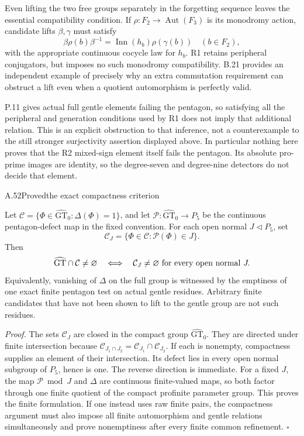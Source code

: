 Even lifting the two free groups separately in the forgetting
sequence leaves the essential compatibility condition. If
$\rho:F_2\to\operatorname{Aut}(F_3)$ is its monodromy action,
candidate lifts $\beta,\gamma$ must satisfy
\[
 \beta\rho(b)\beta^{-1}
   =\operatorname{Inn}(h_b)\rho(\gamma(b))
       \quad(b\in F_2),
\]
with the appropriate continuous cocycle law for $h_b$.
R1 retains peripheral conjugators, but imposes no such
monodromy compatibility. B.21 provides an independent example
of precisely why an extra commutation requirement can obstruct
a lift even when a quotient automorphism is perfectly valid.

P.11 gives actual full gentle elements failing the pentagon,
so satisfying all the peripheral and generation conditions
used by R1 does not imply that additional relation. This is
an explicit obstruction to that inference, not a counterexample
to the still stronger surjectivity assertion displayed above.
In particular nothing here proves that the R2 mixed-sign
element itself fails the pentagon. Its absolute pro-prime
images are identity, so the degree-seven and degree-nine
detectors do not decide that element.

\begin{statement}{A.52}{Proved}{the exact compactness criterion}
\end{statement}
Let $\mathcal C=\{\Phi\in\widehat{\mathrm{GT}}_0:
\Delta(\Phi)=1\}$, and let
$\mathcal P:\widehat{\mathrm{GT}}_0\to P_5$ be the continuous
pentagon-defect map in the fixed convention. For each open
normal $J\triangleleft P_5$, set
\[
 \mathcal C_J=
 \{\Phi\in\mathcal C:\mathcal P(\Phi)\in J\}.
\]
Then
\[
 \widehat{\mathrm{GT}}\cap\mathcal C\ne\varnothing
 \quad\Longleftrightarrow\quad
 \mathcal C_J\ne\varnothing\ \hbox{for every open normal }J.
\]
Equivalently, vanishing of $\Delta$ on the full group is
witnessed by the emptiness of one exact finite pentagon test
on actual gentle residues. Arbitrary finite candidates that
have not been shown to lift to the gentle group are not such
residues.

\emph{Proof.}
The sets $\mathcal C_J$ are closed in the compact group
$\widehat{\mathrm{GT}}_0$. They are directed under finite
intersection because
$\mathcal C_{J_1\cap J_2}=\mathcal C_{J_1}\cap\mathcal C_{J_2}$.
If each is nonempty, compactness supplies an element of their
intersection. Its defect lies in every open normal subgroup
of $P_5$, hence is one. The reverse direction is immediate.
For a fixed $J$, the map $\mathcal P\bmod J$ and $\Delta$
are continuous finite-valued maps, so both factor through
one finite quotient of the compact profinite parameter group.
This proves the finite formulation. If one instead uses raw
finite pairs, the compactness argument must also impose all
finite automorphism and gentle relations simultaneously and
prove nonemptiness after every finite common refinement.
\hfill$\square$

